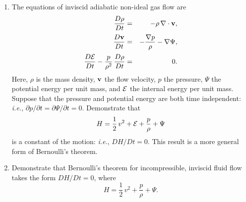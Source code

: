 {\begin{enumerate}
 Demonstrate that
 $$
 H = \frac{1}{2}\,v^2 + \frac{\gamma}{\gamma-1}\,\frac{p}{\rho} + \Psi
 $$
 is a constant of the motion: {\em i.e.}, $DH/Dt = 0$. This result is known as {\em Bernoulli's theorem}. 
 
\item The equations of  inviscid  adiabatic non-ideal gas flow are
 \begin{eqnarray}
 \frac{D\rho}{Dt} &=&-\rho\,\nabla\cdot{\bf v},\nonumber\\[0.5ex]
 \frac{D{\bf v}}{Dt} &=& - \frac{\nabla p}{\rho} - \nabla\Psi,\nonumber\\[0.5ex]
 \frac{D{\cal E}}{Dt} - \frac{p}{\rho^2}\,\frac {D\rho}{Dt} &=&0.\nonumber
 \end{eqnarray}
 Here, $\rho$ is the mass density, ${\bf v}$ the flow velocity, $p$ the pressure, $\Psi$ the
 potential energy per unit mass, and ${\cal E}$ the internal energy per unit mass. 
 Suppose that the pressure and potential energy are both time independent: {\em i.e.}, $\partial p/\partial t=
 \partial\Psi/\partial t=0$. 
 Demonstrate that
 $$
 H = \frac{1}{2}\,v^2 + {\cal E}+ \frac{p}{\rho} + \Psi
 $$
 is a constant of the motion: {\em i.e.}, $DH/Dt = 0$. This result is a more general form of Bernoulli's theorem. 
 
 \item Demonstrate that Bernoulli's theorem for incompressible, inviscid fluid flow takes the form $DH/Dt=0$, where
 $$
 H = \frac{1}{2}\,v^2 + \frac{p}{\rho} + \Psi.
 $$

\end{enumerate}}
